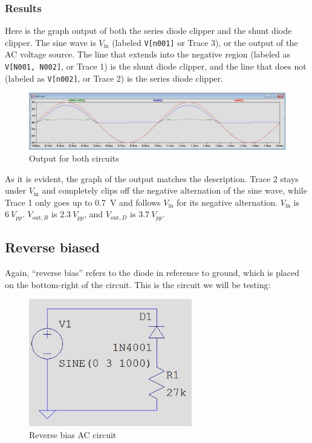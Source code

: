 \documentclass{article}
\begin{document}
\subsubsection{Results} Here is the graph output of both
the series diode clipper and the shunt diode clipper.
The sine wave is \(V_\text{in}\)
(labeled \texttt{V[n001]} or Trace 3), or the output of the
AC voltage source. The line that extends into the negative
region (labeled as \texttt{V[N001, N002]}, or Trace 1)
is the shunt diode clipper, and the line that does
not (labeled as \texttt{V[n002]}, or Trace 2)
is the series diode clipper.

\begin{figure}[h]
    \centering
    \includegraphics[width=\textwidth]{Images/3VACForward.jpg}
    \caption{Output for both circuits}
\end{figure}

As it is evident, the graph of the output matches the
description. Trace 2 stays under \(V_\text{in}\) and completely
clips off the negative alternation of the sine wave, while
Trace 1 only goes up to \SI{0.7}{V} and follows \(V_\text{in}\)
for its negative alternation.
\(V_\text{in}\) is \(\SI{6}{V}_{pp}\). \(V_{\text{out},R}\)
is \(\SI{2.3}{V}_{pp}\), and \(V_{\text{out},D}\) is \(\SI{3.7}{V}_{pp}\).

\subsection{Reverse biased} Again, ``reverse
bias'' refers to the diode in reference to ground, which is
placed on the bottom-right of the circuit. This is the circuit
we will be testing:

\begin{figure}[h]
    \centering
    \includegraphics[height=15em]{Images/Circuit2Reverse.jpg}
    \caption{Reverse bias AC circuit}
\end{figure}
\end{document}
